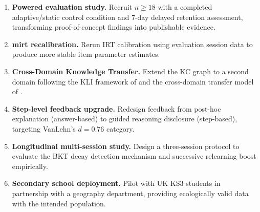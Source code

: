 \begin{enumerate}[leftmargin=2em]
  \item \textbf{Powered evaluation study.} Recruit $n \geq 18$ with a
    completed adaptive/static control condition and 7-day delayed retention
    assessment, transforming proof-of-concept findings into publishable evidence.
  \item \textbf{mirt recalibration.} Rerun IRT calibration using evaluation
    session data to produce more stable item parameter estimates.
  \item \textbf{Cross-Domain Knowledge Transfer.} Extend the KC graph to a
    second domain following the KLI framework of \textcite{koedinger2012} and
    the cross-domain transfer model of \textcite{singley1989}.
  \item \textbf{Step-level feedback upgrade.} Redesign feedback from
    post-hoc explanation (answer-based) to guided reasoning disclosure
    (step-based), targeting VanLehn's $d = 0.76$ category.
  \item \textbf{Longitudinal multi-session study.} Design a three-session
    protocol to evaluate the BKT decay detection mechanism and successive
    relearning boost empirically.
  \item \textbf{Secondary school deployment.} Pilot with UK KS3 students
    in partnership with a geography department, providing ecologically valid
    data with the intended population.
\end{enumerate}
